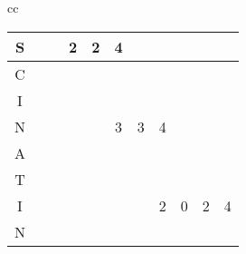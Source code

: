 \begin{table}
\begin{center}
\begin{tabular}[c]{cc}
{\begin{tabular}[c]{c|c|c|c|c|c|c|c|c|c|c|}
				S                    &                       &                       & \cellcolor{green!25}2 &
				\cellcolor{blue!25}2 & \cellcolor{green!25}4 &                       &                       &                      &                       &                                                                                                                   \\\hline
				C                    &                       &                       & \cellcolor{green!25}  & \cellcolor{green!25} & \cellcolor{green!25}  &                       &                      &                      &                      &                      \\\hline
				I                    &                       &                       & \cellcolor{green!25}  & \cellcolor{green!25} & \cellcolor{blue!25}   & \cellcolor{green!25}  & \cellcolor{green!25} &                      &                      &                      \\\hline
				N                    &                       &                       &                       &
				                     & \cellcolor{blue!25}3  & \cellcolor{green!25}3 & \cellcolor{green!25}4 &                      &                       &                                                                                                                   \\\hline
				A                    &                       &                       &                       &                      & \cellcolor{green!25}  & \cellcolor{green!25}  & \cellcolor{green!25} &                      &                      &                      \\\hline
				T                    &                       &                       &                       &                      & \cellcolor{green!25}  & \cellcolor{green!25}  & \cellcolor{blue!25}  & \cellcolor{green!25} & \cellcolor{green!25} & \cellcolor{green!25} \\\hline
				I                    &                       &                       &                       &
				                     &                       &                       & \cellcolor{green!25}2 & \cellcolor{blue!25}0 & \cellcolor{green!25}2 & \cellcolor{green!25}4                                                                                             \\\hline
				N                    &                       &                       &                       &                      &                       &                       & \cellcolor{green!25} & \cellcolor{green!25} & \cellcolor{green!25} & \cellcolor{green!25} \\\hline

\end{tabular}}
\end{tabular}
\end{center}
\end{table}
